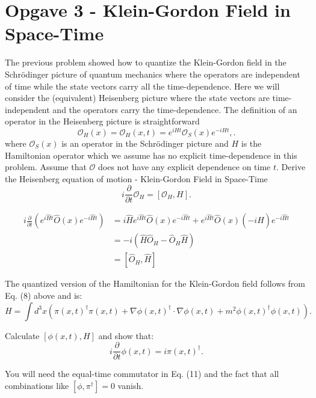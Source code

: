 \documentclass[working, oneside]{../../Preambles/tuftebook}
\begin{document}
\let\cleardoublepage\clearpage
\thispagestyle{fancy}
\chapter{Opgave 3 - Klein-Gordon Field in Space-Time}
\begin{exercise}[3.1]
The previous problem showed how to quantize the Klein-Gordon field in the 
Schrödinger picture of quantum mechanics where the operators are independent 
of time while the state vectors carry all the time-dependence. Here we will 
consider the (equivalent) Heisenberg picture where the state vectors are 
time-independent and the operators carry the time-dependence. The definition 
of an operator in the Heisenberg picture is straightforward
\[
\mathcal{O}_H(x) = \mathcal{O}_H(x,t) = e^{iHt} \mathcal{O}_S(x) e^{-iHt}, \tag{30}
.\]
\color{foreground} 
where $\mathcal{O}_S(x)$ is an operator in the Schrödinger picture and $H$ is the 
Hamiltonian operator which we assume has no explicit time-dependence in this 
problem. Assume that $\mathcal{O}$ does not have any explicit dependence on time $t$. 
Derive the Heisenberg equation of motion - Klein-Gordon Field in Space-Time
\[
i \frac{\partial }{\partial t} \mathcal{O}_H = \left[ \mathcal{O}_H, H \right] 
.\] 
\end{exercise}
\begin{solution}
\begin{align*}
    i\frac{\partial}{\partial t} \left( e^{i\hat{H}t} \hat{O}(x) e^{-i\hat{H}t} \right) &= i\hat{H}e^{i\hat{H}t}\hat{O}\left( x \right) e^{-i\hat{H}t} +e^{i\hat{H}t}\hat{O}\left( x \right)\left( -i\hat{H} \right)  e^{-i\hat{H}t}  \\
&= -i \left( \hat{H} \hat{O}_H - \hat{O}_H \hat{H} \right) \\
&= [\hat{O}_H, \hat{H}]
\end{align*}
\end{solution}
\begin{exercise}[3.2]
The quantized version of the Hamiltonian for the Klein-Gordon field follows 
from Eq. (8) above and is:
\[
H = \int d^3x \left( \pi(x, t)^\dagger \pi(x, t) 
+ \nabla \phi(x, t)^\dagger \cdot \nabla \phi(x, t) 
+ m^2 \phi(x, t)^\dagger \phi(x, t) \right). \tag{32}
\]

Calculate \( [\phi(x, t), H] \) and show that:
\[
i \frac{\partial}{\partial t} \phi(x, t) = i \pi(x, t)^\dagger. \tag{33}
\]

You will need the equal-time commutator in Eq. (11) and the fact that all 
combinations like \( [\phi, \pi^\dagger] = 0 \) vanish.

\end{exercise}
\end{document}
